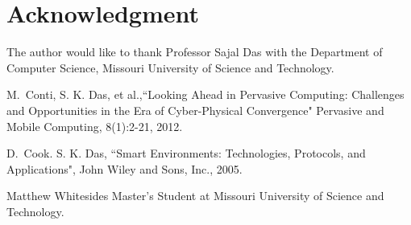 \documentclass[journal,onecolumn]{IEEEtran}
\begin{document}
\section*{Acknowledgment}
The author would like to thank Professor Sajal Das with the Department of Computer Science, Missouri University of Science and Technology.

\ifCLASSOPTIONcaptionsoff
  \newpage
\fi

\begin{thebibliography}{1}

M.~Conti, S. K. Das, et al.,``Looking Ahead in Pervasive Computing: Challenges and Opportunities in the Era of Cyber-Physical Convergence" Pervasive and Mobile Computing, 8(1):2-21, 2012.

D.~Cook. S. K. Das, ``Smart Environments: Technologies, Protocols, and Applications", John Wiley and Sons, Inc., 2005.

\end{thebibliography}

\begin{IEEEbiographynophoto}{Matthew Whitesides}
  Master's Student at Missouri University of Science and Technology.
\end{IEEEbiographynophoto}

\end{document}
